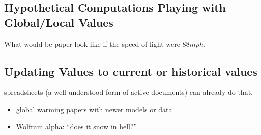 \subsection{Hypothetical Computations Playing with Global/Local Values}\label{sec:hyp}
What would be paper look like if the speed of light were $88 mph$. 

\subsection{Updating Values to current or historical values}
spreadsheets (a well-understood form of active documents) can already do that. 
\begin{itemize}
\item global warming papers with newer models or data
\item Wolfram alpha: ``does it snow in hell?''
\end{itemize}





